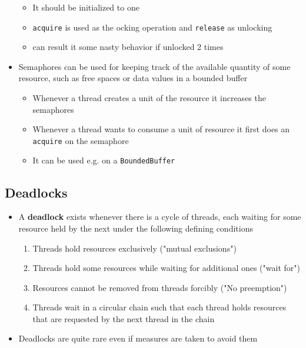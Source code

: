 \documentclass[11pt]{article}
\providecommand{\tightlist}{%
      \setlength{\itemsep}{0pt}\setlength{\parskip}{0pt}}
\begin{document}
\begin{itemize}
  \begin{itemize}
  \tightlist
  \item
    It should be initialized to one
  \item
    \texttt{acquire} is used as the ocking operation and
    \texttt{release} as unlocking
  \item
    can result it some nasty behavior if unlocked 2 times
  \end{itemize}
\item
  Semaphores can be used for keeping track of the available quantity of
  some resource, such as free spaces or data values in a bounded buffer

  \begin{itemize}
  \tightlist
  \item
    Whenever a thread creates a unit of the resource it increases the
    semaphores
  \item
    Whenever a thread wants to consume a unit of resource it first does
    an \texttt{acquire} on the semaphore
  \item
    It can be used e.g. on a \texttt{BoundedBuffer}
  \end{itemize}
\end{itemize}

    \subsection{Deadlocks}\label{deadlocks}

\begin{itemize}
\tightlist
\item
  A \textbf{deadlock} exists whenever there is a cycle of threads, each
  waiting for some resource held by the next under the following
  defining conditions

  \begin{enumerate}
  \def\labelenumi{\arabic{enumi}.}
  \tightlist
  \item
    Threads hold resources exclusively ("mutual exclusions")
  \item
    Threads hold some resources while waiting for additional ones ("wait
    for")
  \item
    Resources cannot be removed from threads forcibly ("No preemption")
  \item
    Threads wait in a circular chain such that each thread holds
    resources that are requested by the next thread in the chain
  \end{enumerate}
\item
  Deadlocks are quite rare even if measures are taken to avoid them
\end{itemize}
\end{document}
